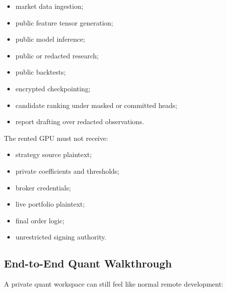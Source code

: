 \documentclass[11pt]{article}
\begin{document}
\begin{itemize}[leftmargin=1.5em]
\item market data ingestion;
\item public feature tensor generation;
\item public model inference;
\item public or redacted research;
\item public backtests;
\item encrypted checkpointing;
\item candidate ranking under masked or committed heads;
\item report drafting over redacted observations.
\end{itemize}

The rented GPU must not receive:

\begin{itemize}[leftmargin=1.5em]
\item strategy source plaintext;
\item private coefficients and thresholds;
\item broker credentials;
\item live portfolio plaintext;
\item final order logic;
\item unrestricted signing authority.
\end{itemize}

\subsection{End-to-End Quant Walkthrough}

A private quant workspace can still feel like normal remote development:
\end{document}
